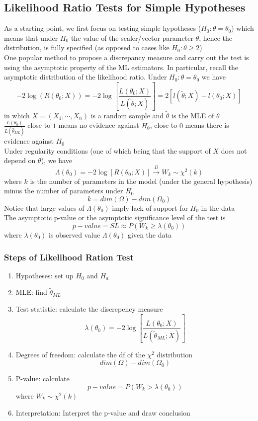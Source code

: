 \documentclass[11pt]{article}
\begin{document}
\subsection{Likelihood Ratio Tests for Simple Hypotheses}
As a starting point, we first focus on testing simple hypotheses ($H_0:\theta=\theta_0$) which means that under 
$H_0$ the value of the scaler/vector parameter $\theta$, hence the distribution, is fully specified (as opposed to cases like $H_0:\theta\geq 2$) \\
One popular method to propose a discrepancy measure and carry
out the test is using the asymptotic property of the ML estimators.
In particular, recall the asymptotic distribution of the likelihood
ratio. Under $H_0:\theta=\theta_0$ we have 
\[-2\log(R(\theta_0;X)) = -2\log\left[\frac{L(\theta_0;X)}{L(\tilde{\theta};X)}\right] = 2\left[l(\tilde{\theta};X)-l(\theta_0;X)\right]\]
in which $X=(X_1,\cdots,X_n)$ is a random sample and $\tilde{\theta}$ is the MLE of $\theta$ \\
$\frac{L(\theta_0)}{L(\hat\theta_{ML})}$ close to $1$ means no evidence against $H_0$, close to $0$ means there is evidence against $H_0$ \\
Under regularity conditions (one of which being that the support of $X$ does not depend on $\theta$), we have
\[\Lambda(\theta_0) = -2\log[R(\theta_0;X)]\overset{D}{\rightarrow}W_k\sim\chi^2(k)\]
where $k$ is the number of parameters in the model (under the general hypothesis) minus the number of parameters under $H_0$
\[k=dim(\Omega)-dim(\Omega_0)\]
Notice that large values of $\Lambda(\theta_0)$ imply lack of support for $H_0$ in the data \\
The asymptotic p-value or the asymptotic significance level of the test is 
\[p-value = SL\approx P(W_k\geq\lambda(\theta_0))\]
where $\lambda(\theta_0)$ is observed value $\Lambda(\theta_0)$ given the data 
\subsubsection{Steps of Likelihood Ration Test}
\begin{enumerate}
    \item Hypotheses: set up $H_0$ and $H_a$
    \item MLE: find $\tilde{\theta}_{ML}$
    \item Test statistic: calculate the discrepency measure \[\lambda(\theta_0)=-2\log\left[\frac{L(\theta_0;X)}{L(\tilde{\theta}_{ML};X)}\right]\]
    \item Degrees of freedom: calculate the df of the $\chi^2$ distribution \[dim(\Omega)-dim(\Omega_0)\]
    \item P-value: calculate \[p-value=P(W_k>\lambda(\theta_0))\] where $W_k\sim\chi^2(k)$
    \item Interpretation: Interpret the p-value and draw conclusion
\end{enumerate}
\end{document}
